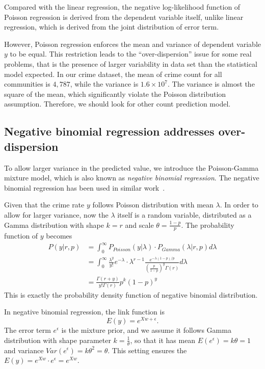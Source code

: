 Compared with the linear regression, the negative log-likelihood function of Poisson regression is derived from the dependent variable itself, unlike linear regression, which is derived from the joint distribution of error term. 


However, Poisson regression enforces the mean and variance of dependent variable $y$ to be equal. This restriction leads to the ``over-dispersion'' issue for some real problems, that is the presence of larger variability in data set than the statistical model expected. In our crime dataset, the mean of crime count for all communities is $4,787$, while the variance is $1.6 \times 10^7$. The variance is almost the square of the mean, which significantly violate the Poisson distribution assumption. Therefore, we should look for other count prediction model.





\subsection{Negative binomial regression addresses over-dispersion}

To allow larger variance in the predicted value,  we introduce the Poisson-Gamma mixture model, which is also known as \emph{negative binomial regression}.  The negative binomial regression has been used in similar work~\cite{Osg00}.




Given that the crime rate $y$ follows Poisson distribution with mean $\lambda$.  In order to allow for larger variance, now the $\lambda$ itself is a random variable, distributed as a Gamma distribution with shape $k=r$ and scale $\theta = \frac{1-p}{p}$.  The probability function of $y$ becomes
\begin{align}
P(y| r, p) & = \int_0^{\infty} P_{Poisson}(y|\lambda) \cdot P_{Gamma}(\lambda|r, p) d \lambda \nonumber \\ 
		& = \int_0^{\infty} \frac{\lambda^y}{y!} e^{-\lambda} \cdot \lambda^{r-1} \frac{e^{-\lambda(1-p)/p}}{(\frac{p}{1-p})^y \Gamma(r)} d\lambda  \nonumber \\
		& = \frac{\Gamma(r+y)}{y! \Gamma(r)} p^k (1-p)^y
\end{align}
This is exactly the probability density function of negative binomial distribution.


In negative binomial regression, the link function is
\begin{equation}
E(y) = e^{X w + \epsilon}.
\end{equation}
The error term $e^\epsilon$ is the mixture prior, and we assume it follows Gamma distribution with shape parameter $k=\frac{1}{\theta}$, so that it has mean $E(e^\epsilon) = k\theta = 1$ and variance $Var(e^\epsilon) = k\theta^2 = \theta$. This setting ensures the $E(y) = e^{Xw} \cdot e^\epsilon = e^{Xw}$.



